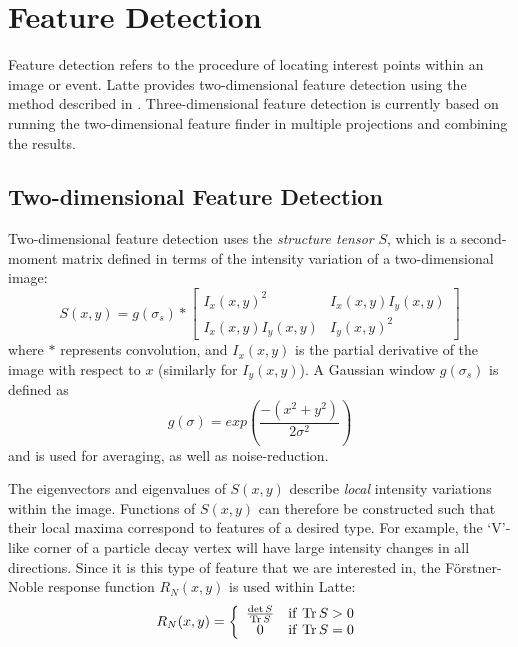 \section{Feature Detection}\label{sec:latte_feature_detection}
Feature detection refers to the procedure of locating interest points within an image or event. Latte provides two-dimensional feature detection using the method described in \citep{Morgan2010}. Three-dimensional feature detection is currently based on running the two-dimensional feature finder in multiple projections and combining the results.

\subsection{Two-dimensional Feature Detection}
Two-dimensional feature detection uses the \emph{structure tensor} $S$, which is a second-moment matrix defined in terms of the intensity variation of a two-dimensional image:\citep{Morgan2010}
\begin{equation}\label{eqn:structure_tensor}
    S(x,y) = g(\sigma_s) \ast \left[ \begin{array}{cc} I_x(x,y)^2 & I_x(x,y)I_y(x,y) \\ I_x(x,y)I_y(x,y) & I_y(x,y)^2 \end{array} \right]
\end{equation}
where $\ast$ represents convolution, and $I_x(x,y)$ is the partial derivative of the image with respect to $x$ (similarly for $I_y(x,y)$). A Gaussian window $g(\sigma_s)$ is defined as
\begin{equation}\label{eqn:feature_det_gaussian_window}
    g(\sigma) = exp\left( \frac{-(x^2 + y^2)}{2\sigma^2} \right)
\end{equation}
and is used for averaging, as well as noise-reduction.

The eigenvectors and eigenvalues of $S(x,y)$ describe \emph{local} intensity variations within the image. Functions of $S(x,y)$ can therefore be constructed such that their local maxima correspond to features of a desired type. For example, the `V'-like corner of a particle decay vertex will have large intensity changes in all directions. Since it is this type of feature that we are interested in, the F\"orstner-Noble response function $R_N(x,y)$ is used within Latte:
\begin{equation}\label{eqn:forstner-noble}
    R_N(x,y) = \left\{ \begin{array}{cl} \frac{\det S}{\mathrm{Tr}\, S} & \mathrm{if~} \mathrm{Tr}\, S > 0 \\ 0 & \mathrm{if~} \mathrm{Tr}\, S = 0 \end{array} \right.
\end{equation}


